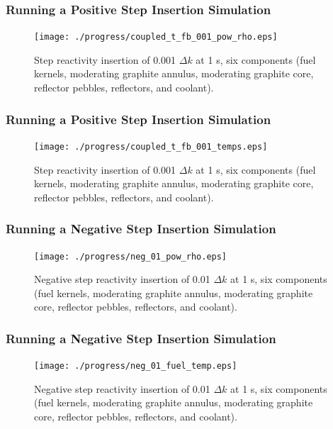 \begin{frame}[fragile]
\frametitle{Running a Positive Step Insertion Simulation}
  \begin{figure}[htbp!]
    \begin{center}
      \texttt{[image: ./progress/coupled\_t\_fb\_001\_pow\_rho.eps]}
    \end{center}
    \caption{Step reactivity insertion of 0.001 $\Delta k$ at 1 s, six components (fuel kernels, moderating graphite annulus, moderating graphite core, reflector pebbles, reflectors, and coolant).}
    \label{fig:all_comps_temps}
  \end{figure}
\end{frame}
\begin{frame}[fragile]
\frametitle{Running a Positive Step Insertion Simulation}
  \begin{figure}[htbp!]
    \begin{center}
      \texttt{[image: ./progress/coupled\_t\_fb\_001\_temps.eps]}
    \end{center}
    \caption{Step reactivity insertion of 0.001 $\Delta k$ at 1 s, six components (fuel kernels, moderating graphite annulus, moderating graphite core, reflector pebbles, reflectors, and coolant).}
    \label{fig:all_comps_temps}
  \end{figure}
\end{frame}


\begin{frame}[fragile]
\frametitle{Running a Negative Step Insertion Simulation}
  \begin{figure}[htbp!]
    \begin{center}
      \texttt{[image: ./progress/neg\_01\_pow\_rho.eps]}
    \end{center}
    \caption{Negative step reactivity insertion of 0.01 $\Delta k$ at 1 s, six components (fuel kernels, moderating graphite annulus, moderating graphite core, reflector pebbles, reflectors, and coolant).}
    \label{fig:all_comps_temps}
  \end{figure}
\end{frame}

\begin{frame}[fragile]
\frametitle{Running a Negative Step Insertion Simulation}
  \begin{figure}[htbp!]
    \begin{center}
      \texttt{[image: ./progress/neg\_01\_fuel\_temp.eps]}
    \end{center}
    \caption{Negative step reactivity insertion of 0.01 $\Delta k$ at 1 s, six components (fuel kernels, moderating graphite annulus, moderating graphite core, reflector pebbles, reflectors, and coolant).}
    \label{fig:all_comps_temps}
  \end{figure}
\end{frame}

